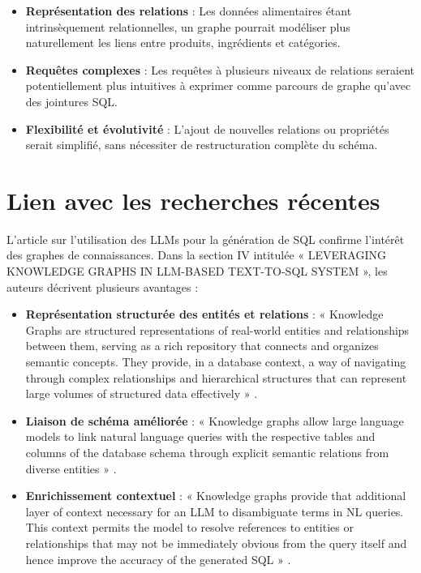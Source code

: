 \documentclass[a4paper,11pt]{article}
\begin{document}
\begin{itemize}
    \item \textbf{Représentation des relations} : Les données alimentaires étant intrinsèquement relationnelles, un graphe pourrait modéliser plus naturellement les liens entre produits, ingrédients et catégories.
    
    \item \textbf{Requêtes complexes} : Les requêtes à plusieurs niveaux de relations seraient potentiellement plus intuitives à exprimer comme parcours de graphe qu'avec des jointures SQL.
    
    \item \textbf{Flexibilité et évolutivité} : L'ajout de nouvelles relations ou propriétés serait simplifié, sans nécessiter de restructuration complète du schéma.
\end{itemize}



\newpage

\section{Lien avec les recherches récentes}
\label{sec:recherches}

L'article \citet{mohammadjafari2024natural} sur l'utilisation des LLMs pour la génération de SQL confirme l'intérêt des graphes de connaissances. Dans la section IV intitulée « LEVERAGING KNOWLEDGE GRAPHS IN LLM-BASED TEXT-TO-SQL SYSTEM », les auteurs décrivent plusieurs avantages :

\begin{itemize}
    \item \textbf{Représentation structurée des entités et relations} : « Knowledge Graphs are structured representations of real-world entities and relationships between them, serving as a rich repository that connects and organizes semantic concepts. They provide, in a database context, a way of navigating through complex relationships and hierarchical structures that can represent large volumes of structured data effectively » \citep{mohammadjafari2024natural}.
    
    \item \textbf{Liaison de schéma améliorée} : « Knowledge graphs allow large language models to link natural language queries with the respective tables and columns of the database schema through explicit semantic relations from diverse entities » \citep{mohammadjafari2024natural}.
    
    \item \textbf{Enrichissement contextuel} : « Knowledge graphs provide that additional layer of context necessary for an LLM to disambiguate terms in NL queries. This context permits the model to resolve references to entities or relationships that may not be immediately obvious from the query itself and hence improve the accuracy of the generated SQL » \citep{mohammadjafari2024natural}.
\end{itemize}
\end{document}
